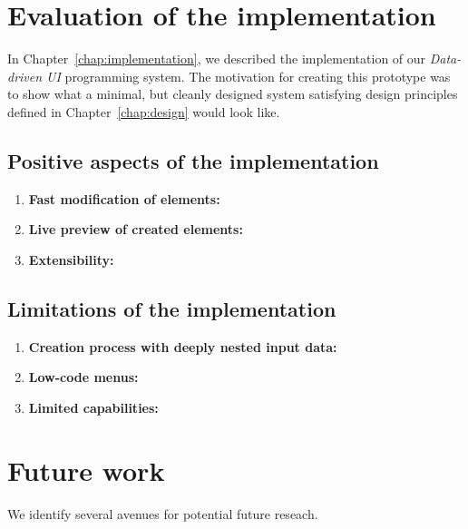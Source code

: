 \section{Evaluation of the implementation}

In Chapter~\ref{chap:implementation}, we described the implementation of our \emph{Data-driven UI} programming system.
The motivation for creating this prototype was to show what a minimal, but cleanly designed system satisfying design principles defined in Chapter~\ref{chap:design} would look like.

\subsection{Positive aspects of the implementation}


\begin{enumerate}
	\item \textbf{Fast modification of elements:}
	\item \textbf{Live preview of created elements:}
	\item \textbf{Extensibility:}
\end{enumerate}

\subsection{Limitations of the implementation}
\begin{enumerate}
	\item \textbf{Creation process with deeply nested input data:}
	\item \textbf{Low-code menus:}
	\item \textbf{Limited capabilities:}
\end{enumerate}
\section{Future work}

We identify several avenues for potential future reseach.
